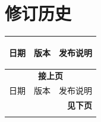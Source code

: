 \section*{修订历史}\label{revision-history}
\rhead{\Navigation}

\begin{longtable}[l]{ | m{2cm} | m{1.5cm} | m{12cm} | }\hline

    \rowcolor{lightgray}
    日期 & 版本 & \hypertarget{Release notes}{发布说明}\\\hline
    \endfirsthead

    \multicolumn{3}{c}{\bfseries 接上页}\\\hline
    \rowcolor{lightgray}
    日期 & 版本 & 发布说明\\\hline
    \endhead

    \multicolumn{3}{r}{\textbf{见下页}}\\
    \endfoot

    \endlastfoot



\end{longtable}
